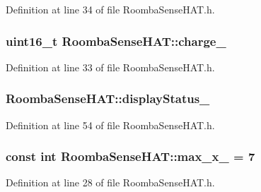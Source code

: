 Definition at line 34 of file Roomba\+Sense\+H\+A\+T.\+h.

\subsubsection[{\texorpdfstring{charge\+\_\+}{charge_}}]{\setlength{\rightskip}{0pt plus 5cm}uint16\+\_\+t Roomba\+Sense\+H\+A\+T\+::charge\+\_\+\hspace{0.3cm}{\ttfamily [protected]}}\hypertarget{class_roomba_sense_h_a_t_a7a382afdb36d1d297ca1ebc7f984db4f}{}\label{class_roomba_sense_h_a_t_a7a382afdb36d1d297ca1ebc7f984db4f}


Definition at line 33 of file Roomba\+Sense\+H\+A\+T.\+h.

\subsubsection[{\texorpdfstring{display\+Status\+\_\+}{displayStatus_}}]{ Roomba\+Sense\+H\+A\+T\+::display\+Status\+\_\+\hspace{0.3cm}{\ttfamily [protected]}}\hypertarget{class_roomba_sense_h_a_t_acae6b7d45762e2159a100f78ac2250ce}{}\label{class_roomba_sense_h_a_t_acae6b7d45762e2159a100f78ac2250ce}


Definition at line 54 of file Roomba\+Sense\+H\+A\+T.\+h.

\subsubsection[{\texorpdfstring{max\+\_\+x\+\_\+}{max_x_}}]{\setlength{\rightskip}{0pt plus 5cm}const int Roomba\+Sense\+H\+A\+T\+::max\+\_\+x\+\_\+ = 7\hspace{0.3cm}{\ttfamily [protected]}}\hypertarget{class_roomba_sense_h_a_t_a0e74b98418deef0045f13ec563839aaa}{}\label{class_roomba_sense_h_a_t_a0e74b98418deef0045f13ec563839aaa}


Definition at line 28 of file Roomba\+Sense\+H\+A\+T.\+h.

